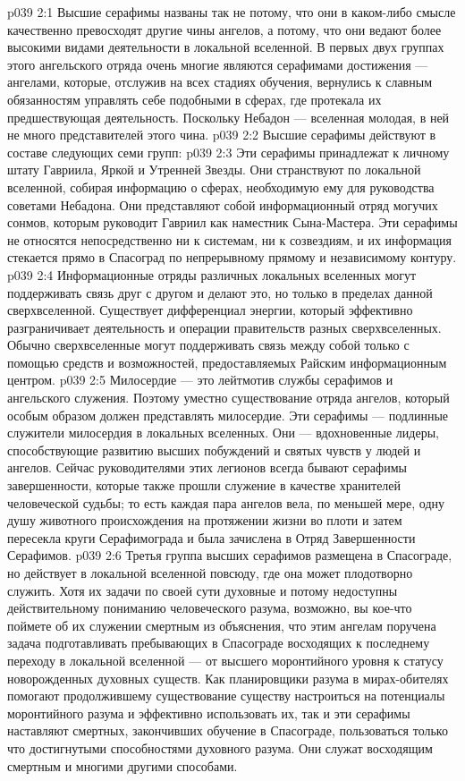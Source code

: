 \vs p039 2:1 Высшие серафимы названы так не потому, что они в каком\hyp{}либо смысле качественно превосходят другие чины ангелов, а потому, что они ведают более высокими видами деятельности в локальной вселенной. В первых двух группах этого ангельского отряда очень многие являются серафимами достижения --- ангелами, которые, отслужив на всех стадиях обучения, вернулись к славным обязанностям управлять себе подобными в сферах, где протекала их предшествующая деятельность. Поскольку Небадон --- вселенная молодая, в ней не много представителей этого чина.
\vs p039 2:2 Высшие серафимы действуют в составе следующих семи групп:
\vs p039 2:3 \bibnobreakspace {} Эти серафимы принадлежат к личному штату Гавриила, Яркой и Утренней Звезды. Они странствуют по локальной вселенной, собирая информацию о сферах, необходимую ему для руководства советами Небадона. Они представляют собой информационный отряд могучих сонмов, которым руководит Гавриил как наместник Сына\hyp{}Мастера. Эти серафимы не относятся непосредственно ни к системам, ни к созвездиям, и их информация стекается прямо в Спасоград по непрерывному прямому и независимому контуру.
\vs p039 2:4 Информационные отряды различных локальных вселенных могут поддерживать связь друг с другом и делают это, но только в пределах данной сверхвселенной. Существует дифференциал энергии, который эффективно разграничивает деятельность и операции правительств разных сверхвселенных. Обычно сверхвселенные могут поддерживать связь между собой только с помощью средств и возможностей, предоставляемых Райским информационным центром.
\vs p039 2:5 \pc {}\bibnobreakspace {} Милосердие --- это лейтмотив службы серафимов и ангельского служения. Поэтому уместно существование отряда ангелов, который особым образом должен представлять милосердие. Эти серафимы --- подлинные служители милосердия в локальных вселенных. Они --- вдохновенные лидеры, способствующие развитию высших побуждений и святых чувств у людей и ангелов. Сейчас руководителями этих легионов всегда бывают серафимы завершенности, которые также прошли служение в качестве хранителей человеческой судьбы; то есть каждая пара ангелов вела, по меньшей мере, одну душу животного происхождения на протяжении жизни во плоти и затем пересекла круги Серафимограда и была зачислена в Отряд Завершенности Серафимов.
\vs p039 2:6 \pc {}\bibnobreakspace {} Третья группа высших серафимов размещена в Спасограде, но действует в локальной вселенной повсюду, где она может плодотворно служить. Хотя их задачи по своей сути духовные и потому недоступны действительному пониманию человеческого разума, возможно, вы кое\hyp{}что поймете об их служении смертным из объяснения, что этим ангелам поручена задача подготавливать пребывающих в Спасограде восходящих к последнему переходу в локальной вселенной --- от высшего моронтийного уровня к статусу новорожденных духовных существ. Как планировщики разума в мирах\hyp{}обителях помогают продолжившему существование существу настроиться на потенциалы моронтийного разума и эффективно использовать их, так и эти серафимы наставляют смертных, закончивших обучение в Спасограде, пользоваться только что достигнутыми способностями духовного разума. Они служат восходящим смертным и многими другими способами.
